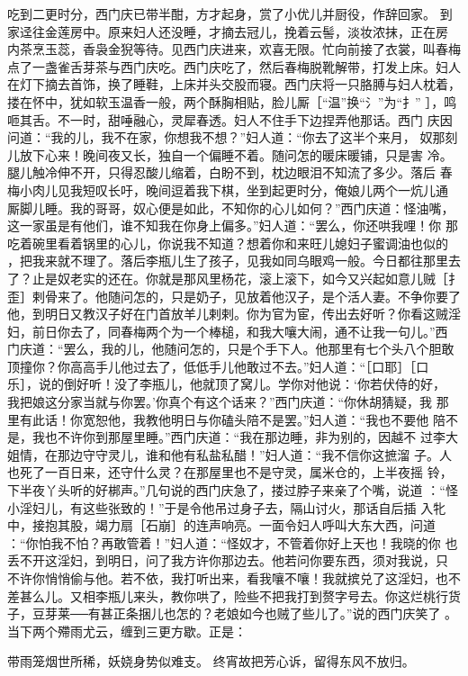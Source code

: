 吃到二更时分，西门庆已带半酣，方才起身，赏了小优儿并厨役，作辞回家。
到家迳往金莲房中。原来妇人还没睡，才摘去冠儿，挽着云髻，淡妆浓抹，正在房
内茶烹玉蕊，香袅金猊等待。见西门庆进来，欢喜无限。忙向前接了衣裳，叫春梅
点了一盏雀舌芽茶与西门庆吃。西门庆吃了，然后春梅脱靴解带，打发上床。妇人
在灯下摘去首饰，换了睡鞋，上床并头交股而寝。西门庆将一只胳膊与妇人枕着，
搂在怀中，犹如软玉温香一般，两个酥胸相贴，脸儿厮［“温”换“氵”为“扌”
］，鸣咂其舌。不一时，甜唾融心，灵犀春透。妇人不住手下边捏弄他那话。西门
庆因问道：“我的儿，我不在家，你想我不想？”妇人道：“你去了这半个来月，
奴那刻儿放下心来！晚间夜又长，独自一个偏睡不着。随问怎的暖床暖铺，只是害
冷。腿儿触冷伸不开，只得忍酸儿缩着，白盼不到，枕边眼泪不知流了多少。落后
春梅小肉儿见我短叹长吁，晚间逗着我下棋，坐到起更时分，俺娘儿两个一炕儿通
厮脚儿睡。我的哥哥，奴心便是如此，不知你的心儿如何？”西门庆道：怪油嘴，
这一家虽是有他们，谁不知我在你身上偏多。”妇人道：“罢么，你还哄我哩！你
那吃着碗里看着锅里的心儿，你说我不知道？想着你和来旺儿媳妇子蜜调油也似的
，把我来就不理了。落后李瓶儿生了孩子，见我如同乌眼鸡一般。今日都往那里去
了？止是奴老实的还在。你就是那风里杨花，滚上滚下，如今又兴起如意儿贼［扌
歪］剌骨来了。他随问怎的，只是奶子，见放着他汉子，是个活人妻。不争你要了
他，到明日又教汉子好在门首放羊儿剌剌。你为官为宦，传出去好听？你看这贼淫
妇，前日你去了，同春梅两个为一个棒槌，和我大嚷大闹，通不让我一句儿。”西
门庆道：“罢么，我的儿，他随问怎的，只是个手下人。他那里有七个头八个胆敢
顶撞你？你高高手儿他过去了，低低手儿他敢过不去。”妇人道：“［口耶］［口
乐］，说的倒好听！没了李瓶儿，他就顶了窝儿。学你对他说：‘你若伏侍的好，
我把娘这分家当就与你罢。’你真个有这个话来？”西门庆道：“你休胡猜疑，我
那里有此话！你宽恕他，我教他明日与你磕头陪不是罢。”妇人道：“我也不要他
陪不是，我也不许你到那屋里睡。”西门庆道：“我在那边睡，非为别的，因越不
过李大姐情，在那边守守灵儿，谁和他有私盐私醋！”妇人道：“我不信你这摭溜
子。人也死了一百日来，还守什么灵？在那屋里也不是守灵，属米仓的，上半夜摇
铃，下半夜丫头听的好梆声。”几句说的西门庆急了，搂过脖子来亲了个嘴，说道
：“怪小淫妇儿，有这些张致的！”于是令他吊过身子去，隔山讨火，那话自后插
入牝中，接抱其股，竭力扇［石崩］的连声响亮。一面令妇人呼叫大东大西，问道
：“你怕我不怕？再敢管着！”妇人道：“怪奴才，不管着你好上天也！我晓的你
也丢不开这淫妇，到明日，问了我方许你那边去。他若问你要东西，须对我说，只
不许你悄悄偷与他。若不依，我打听出来，看我嚷不嚷！我就摈兑了这淫妇，也不
差甚么儿。又相李瓶儿来头，教你哄了，险些不把我打到赘字号去。你这烂桃行货
子，豆芽莱──有甚正条捆儿也怎的？老娘如今也贼了些儿了。”说的西门庆笑了
。当下两个殢雨尤云，缠到三更方歇。正是：

带雨笼烟世所稀，妖娆身势似难支。
终宵故把芳心诉，留得东风不放归。

